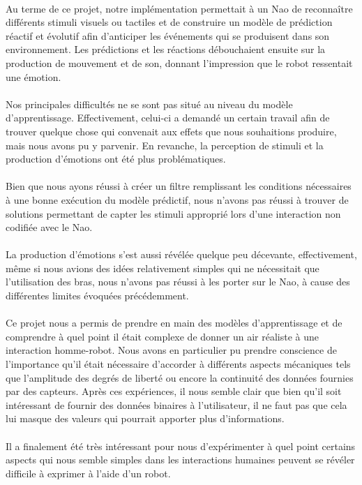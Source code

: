 \paragraph{}
Au terme de ce projet, notre implémentation permettait à un Nao de
reconnaître différents stimuli visuels ou tactiles et de construire un
modèle de prédiction réactif et évolutif afin d'anticiper les événements qui
se produisent dans son environnement. Les prédictions et les réactions
débouchaient ensuite sur la production de mouvement et de son, donnant
l'impression que le robot ressentait une émotion.

\paragraph{}
Nos principales difficultés ne se sont pas situé au niveau du modèle
d'apprentissage. Effectivement, celui-ci a demandé un certain travail afin
de trouver quelque chose qui convenait aux effets que nous souhaitions
produire, mais nous avons pu y parvenir. En revanche, la perception de
stimuli et la production d'émotions ont été plus problématiques. 

\paragraph{}
Bien que nous ayons réussi à créer un filtre remplissant les conditions
nécessaires à une bonne exécution du modèle prédictif, nous n'avons pas
réussi à trouver de solutions permettant de capter les stimuli approprié
lors d'une interaction non codifiée avec le Nao.

\paragraph{}
La production d'émotions s'est aussi révélée quelque peu décevante,
effectivement, même si nous avions des idées relativement simples qui ne
nécessitait que l'utilisation des bras, nous n'avons pas réussi à les porter
sur le Nao, à cause des différentes limites évoquées précédemment.

\paragraph{}
Ce projet nous a permis de prendre en main des modèles d'apprentissage et
de comprendre à quel point il était complexe de donner un air réaliste à une
interaction homme-robot. Nous avons en particulier pu prendre conscience de
l'importance qu'il était nécessaire d'accorder à différents aspects
mécaniques tels que l'amplitude des degrés de liberté ou encore la
continuité des données fournies par des capteurs. Après ces expériences, il
nous semble clair que bien qu'il soit intéressant de fournir des données
binaires à l'utilisateur, il ne faut pas que cela lui masque des valeurs qui
pourrait apporter plus d'informations.

\paragraph{}
Il a finalement été très intéressant pour nous d'expérimenter à quel point
certains aspects qui nous semble simples dans les interactions humaines
peuvent se révéler difficile à exprimer à l'aide d'un robot.
